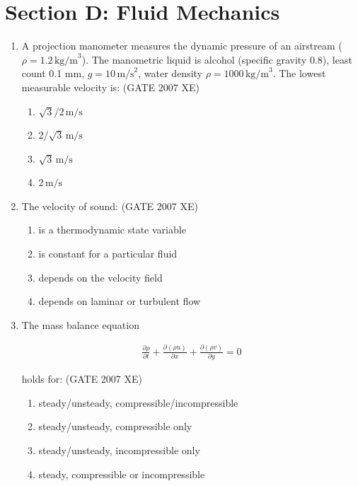 \documentclass[journal,cmex10]{IEEEtran}
\theoremstyle{remark}
\numberwithin{equation}{enumi}
\numberwithin{figure}{enumi}
\begin{document}
\section*{Section D: Fluid Mechanics}
\vspace{2\baselineskip}
\begin{enumerate}
\item A projection manometer measures the dynamic pressure of an airstream ($\rho = 1.2\,\text{kg/m}^3$). The manometric liquid is alcohol (specific gravity 0.8), least count 0.1 mm, $g = 10\,\text{m/s}^2$, water density $\rho = 1000\,\text{kg/m}^3$. The lowest measurable velocity is:
\hfill{(GATE 2007 XE)}

\begin{multicols}{4}
\begin{enumerate}

    \item $\sqrt{3}/2\,\text{m/s}$
    \item $2/\sqrt{3}\,\text{m/s}$
    \item $\sqrt{3}\,\text{m/s}$
    \item $2\,\text{m/s}$
\end{enumerate}
\end{multicols}


\item The velocity of sound:  
\hfill{(GATE 2007 XE)}
\begin{multicols}{2}
\begin{enumerate}
    \item is a thermodynamic state variable
    \item is constant for a particular fluid
    \item depends on the velocity field
    \item depends on laminar or turbulent flow
\end{enumerate}
\end{multicols}

\item The mass balance equation 

\begin{align*}
\frac{\partial \rho}{\partial t} 
+ \frac{\partial (\rho u)}{\partial x} 
+ \frac{\partial (\rho v)}{\partial y} 
= 0
\end{align*}

holds for:  
\hfill{(GATE 2007 XE)}
\begin{multicols}{2}
\begin{enumerate}
    \item steady/unsteady, compressible/incompressible
    \item steady/unsteady, compressible only
    \item steady/unsteady, incompressible only
    \item steady, compressible or incompressible
\end{enumerate}
\end{multicols}


\end{enumerate}
\end{document}
